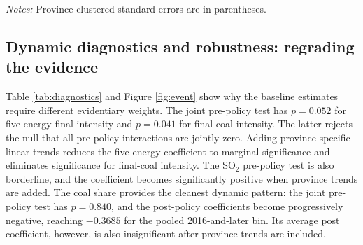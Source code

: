 \documentclass[11pt]{article}
\newcommand{\note}[1]{\begin{minipage}{0.96\textwidth}\footnotesize\textit{Notes:} #1\end{minipage}}
\begin{document}
\begin{table}[H]
\centering
\caption{Coal-use composition, carbon emissions, and thermal structure}
\label{tab:structure}
\note{Province-clustered standard errors are in parentheses.}
\end{table}

\subsection{Dynamic diagnostics and robustness: regrading the evidence}

Table \ref{tab:diagnostics} and Figure \ref{fig:event} show why the baseline estimates require different evidentiary weights. The joint pre-policy test has $p=0.052$ for five-energy final intensity and $p=0.041$ for final-coal intensity. The latter rejects the null that all pre-policy interactions are jointly zero. Adding province-specific linear trends reduces the five-energy coefficient to marginal significance and eliminates significance for final-coal intensity. The SO$_2$ pre-policy test is also borderline, and the coefficient becomes significantly positive when province trends are added. The coal share provides the cleanest dynamic pattern: the joint pre-policy test has $p=0.840$, and the post-policy coefficients become progressively negative, reaching $-0.3685$ for the pooled 2016-and-later bin. Its average post coefficient, however, is also insignificant after province trends are included.
\end{document}
